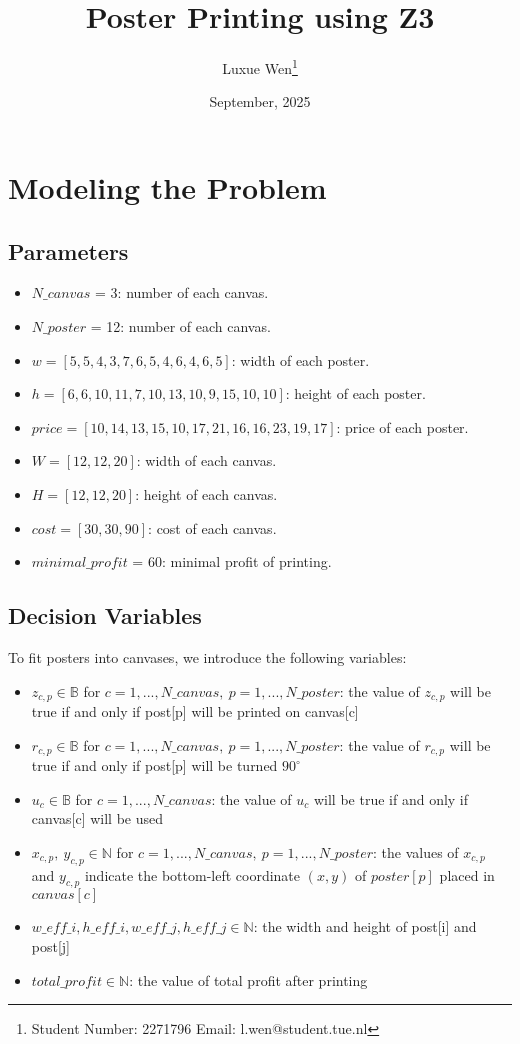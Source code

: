 \documentclass{article}
\title{Poster Printing using Z3}
\author{Luxue Wen\thanks{Student Number: 2271796 Email: l.wen@student.tue.nl}}
\date{September, 2025}
\begin{document}
\maketitle

\section{Modeling the Problem}

\subsection{Parameters}
\begin{itemize}
  \item $N\_canvas$ = 3: number of each canvas.
  \item $N\_poster$ = 12: number of each canvas.
  \item $w = [5, 5, 4, 3, 7, 6, 5, 4, 6, 4, 6, 5]$: width of each poster.
  \item $h = [6, 6, 10, 11, 7, 10, 13, 10, 9, 15, 10, 10]$: height of each poster.
  \item $price = [10, 14, 13, 15, 10, 17, 21, 16, 16, 23, 19, 17]$: price of each poster.
  \item $W = [12, 12, 20]$: width of each canvas.
  \item $H = [12, 12, 20]$: height of each canvas.
  \item $cost = [30, 30, 90]$: cost of each canvas.
  \item $minimal\_profit$ = 60: minimal profit of printing.
\end{itemize}

\subsection{Decision Variables}
To fit posters into canvases, we introduce the following variables:
\begin{itemize}
  \item $z_{c,p} \in \mathbb{B}$ for $c = 1,...,N\_canvas,\ p = 1,...,N\_poster$: the value of $z_{c,p}$ will be true if and only if post[p] will be printed on canvas[c]
  \item $r_{c,p} \in \mathbb{B}$ for $c = 1,...,N\_canvas,\ p = 1,...,N\_poster$: the value of $r_{c,p}$ will be true if and only if post[p] will be turned $90^\circ$ 
  \item $u_c \in \mathbb{B}$ for $c = 1,...,N\_canvas$: the value of $u_c$ will be true if and only if canvas[c] will be used
  \item $x_{c,p},\ y_{c,p} \in \mathbb{N}$ for $c = 1,...,N\_canvas,\ p = 1,...,N\_poster$: the values of $x_{c,p}$ and $y_{c,p}$ indicate the bottom-left coordinate $(x,y)$ of $poster[p]$ placed in $canvas[c]$
  \item $w\_eff\_i,h\_eff\_i,w\_eff\_j,h\_eff\_j \in \mathbb{N}$: the width and height of post[i] and post[j]
  \item $total\_profit \in \mathbb{N}$: the value of total profit after printing
\end{itemize}
\end{document}

